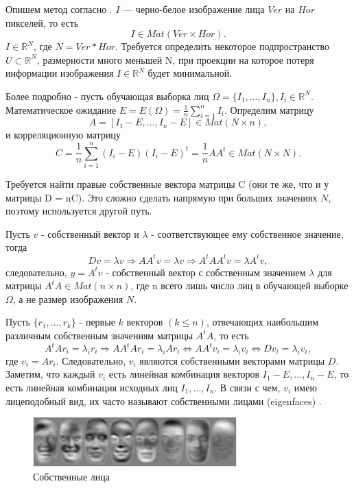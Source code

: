 Опишем метод согласно \cite{volchenko}. $I$ --- черно-белое изображение лица
$Ver$ на $Hor$ пикселей, то есть
\[ I \in Mat(Ver \times Hor).\] $I \in \mathbb{R}^N$, где $N = Ver *
Hor$. Требуется определить некоторое подпространство $U \subset \mathbb{R}^N$,
размерности много меньшей N, при проекции на которое потеря информации
изображения $I \in \mathbb{R}^N$ будет минимальной.


Более подробно - пусть обучающая выборка лиц $\Omega = \{I_1,\dots,I_n\}, I_i
\in \mathbb{R}^N$. Математическое ожидание $E = E(\Omega) =
\frac{1}{n}\sum_{i=1}^nI_i$. Определим матрицу
\[ A =  [I_1 - E,\dots,I_n - E] \in Mat(N \times n),\]
и корреляционную матрицу
\[ C = \frac{1}{n}\sum_{i=1}^n(I_i - E)(I_i - E)^t = \frac{1}{n}AA^t \in Mat(N \times N). \]

Требуется найти правые собственные вектора матрицы C (они те же, что и у матрицы
D = nC). Это сложно сделать напрямую при больших значениях $N$, поэтому
используется другой путь.


Пусть $v$ - собственный вектор и $\lambda$ - соответствующее ему собственное
значение, тогда 
\[ Dv = \lambda v \Rightarrow AA^tv = \lambda v \Rightarrow A^tAA^tv = \lambda A^tv ,\]
следовательно, $y = A^tv$ - собственный вектор с собственным значением $\lambda$
для матрицы $A^tA \in Mat(n \times n)$, где n всего лишь число лиц в обучающей
выборке $\Omega$, а не размер изображения $N$.


Пусть $\{r_1,\dots,r_k\}$ - первые $k$ векторов $(k \leq n)$, отвечающих
наибольшим различным собственным значениям матрицы $A^tA$, то есть
\[ A^tAr_i = \lambda_ir_i \Rightarrow AA^tAr_i = \lambda_iAr_i \Leftrightarrow AA^tv_i = \lambda_iv_i \Leftrightarrow Dv_i = \lambda_iv_i,\]
где $v_i = Ar_i$. Следовательно, $v_i$ являются собственными векторами матрицы
$D$. Заметим, что каждый $v_i$ есть линейная комбинация векторов $I_1 -
E,\dots,I_n - E$, то есть линейная комбинация исходных лиц $I_1,\dots,I_n$. В
связи с чем, $v_i$ имею лицеподобный вид, их часто называют собственными лицами
(eigenfaces) \label{fig:pca-faces}.

\begin{figure}[h!]
  \centering
  \includegraphics[width=0.7\textwidth]{pca_faces.png}
  \caption{Собственные лица}
  \label{fig:pca-faces}
\end{figure}

